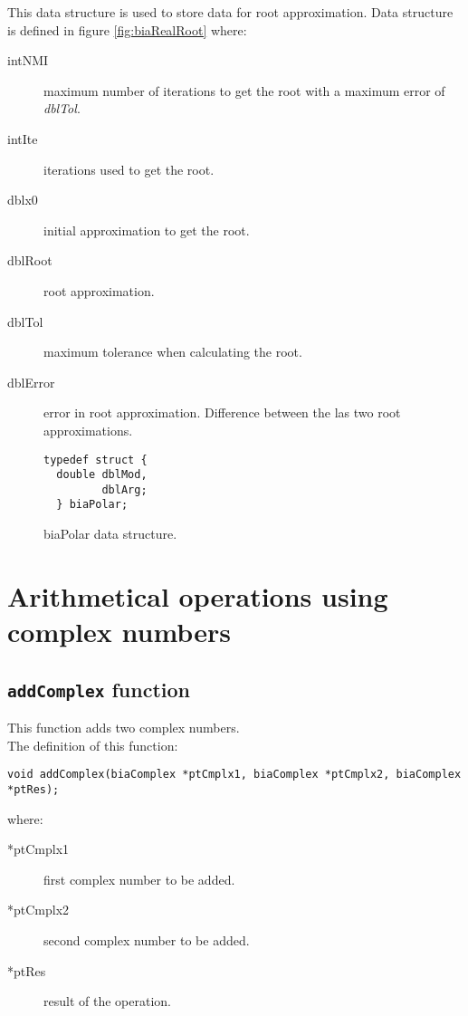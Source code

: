 This data structure is used to store data for root approximation. Data structure is defined in figure \ref{fig:biaRealRoot} where:

\begin{description}
\item[intNMI] maximum number of iterations to get the root with a maximum error of \emph{dblTol}.
\item[intIte] iterations used to get the root.
\item[dblx0] initial approximation to get the root.
\item[dblRoot] root approximation.
\item[dblTol] maximum tolerance when calculating the root.
\item[dblError] error in root approximation. Difference between the las two root approximations.
\end{description}

\begin{figure}[!h]
\begin{verbatim}
typedef struct {
  double dblMod,
         dblArg;
  } biaPolar;
\end{verbatim}
\caption{biaPolar data structure.} \label{fig:biaPolar}
\end{figure}

\FloatBarrier

\section{Arithmetical operations using complex numbers}

\subsection{\texttt{addComplex} function}

This function adds two complex numbers.\\

The definition of this function:
%
\begin{verbatim}
void addComplex(biaComplex *ptCmplx1, biaComplex *ptCmplx2, biaComplex *ptRes);
\end{verbatim}
%
where:
%
\begin{description}
\item[*ptCmplx1] first complex number to be added.
\item[*ptCmplx2] second complex number to be added.
\item[*ptRes] result of the operation.
\end{description}

